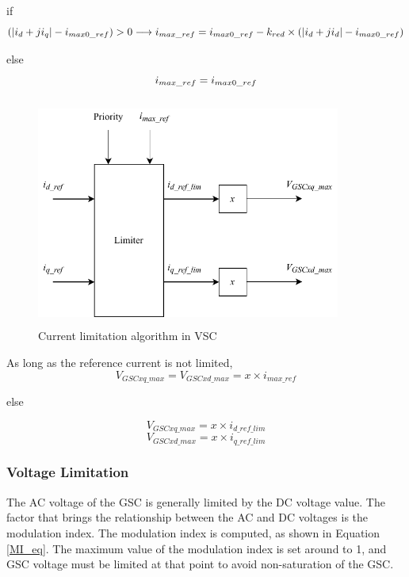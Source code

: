 if
\begin{equation} \label{currentlimeq1}
  (|i_d+ji_q|-i_{max0\_ref})>0 \longrightarrow i_{max\_ref} = i_{max0\_ref} - k_{red} \times (|i_d+ji_d|-i_{max0\_ref}) \\
\end{equation}

else
\begin{equation}\label{currentlimeq2}
    \\
  i_{max\_ref} = i_{max0\_ref}  
 \end{equation}
 
\begin{figure}[H]
\centering
    \includegraphics[height = 7.5cm,width = 10cm]{Diagrams/Chapter_3/Current_Limiter_block.pdf}
    \caption{Current limitation algorithm in VSC \cite{korai_dynamic_2019}}
    \label{fig:Current_Limiter_block}
\end{figure}

As long as the reference current is not limited,
\begin{equation}\label{vol_lim_1}
    V_{GSCxq\_max} = V_{GSCxd\_max} = x \times i_{max\_ref}
\end{equation}

else

\begin{equation}\label{vol_lim_2}
    V_{GSCxq\_max} = x \times i_{d\_ref\_lim} 
\end{equation}
\begin{equation}\label{vol_lim_3}
    V_{GSCxd\_max} = x \times i_{q\_ref\_lim}
\end{equation}

\subsubsection{Voltage Limitation}
The \gls{AC} voltage of the \gls{GSC} is generally limited by the \gls{DC} voltage value. The factor that brings the relationship between the \gls{AC} and \gls{DC} voltages is the modulation index. The modulation index is computed, as shown in Equation \ref{MI_eq}. The maximum value of the modulation index is set around to 1, and \gls{GSC} voltage must be limited at that point to avoid non-saturation of the \gls{GSC}. 

